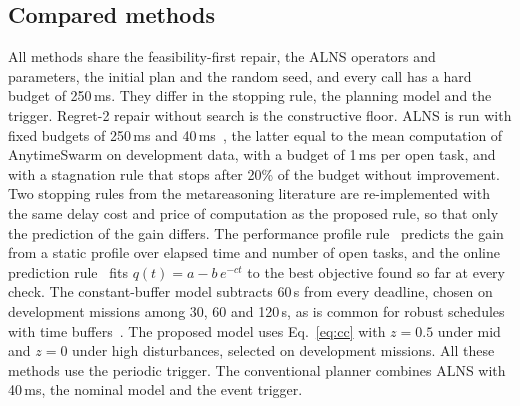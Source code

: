 \subsection{Compared methods}\label{sec:methods}
All methods share the feasibility-first repair, the ALNS operators and parameters, the initial plan and the random seed,
and every call has a hard budget of 250\,ms. They differ in the stopping rule, the planning model and the trigger.
Regret-2 repair without search is the constructive floor. ALNS is run with fixed budgets of 250\,ms and
40\,ms~\cite{ropke2006adaptive}, the latter equal to the mean computation of AnytimeSwarm on development data, with a
budget of 1\,ms per open task, and with a stagnation rule that stops after 20\% of the budget without improvement. Two
stopping rules from the metareasoning literature are re-implemented with the same delay cost and price of computation
as the proposed rule, so that only the prediction of the gain differs. The performance profile
rule~\cite{boddy1994deliberation,zilberstein1996using} predicts the gain from a static profile over elapsed time and
number of open tasks, and the online prediction rule~\cite{svegliato2018meta} fits $q(t)=a-b\,e^{-ct}$ to the best
objective found so far at every check. The constant-buffer model subtracts 60\,s from every deadline, chosen on
development missions among 30, 60 and 120\,s, as is common for robust schedules with time
buffers~\cite{agra2013robust}. The proposed model uses Eq.~\eqref{eq:cc} with $z=0.5$ under mid and $z=0$ under high
disturbances, selected on development missions. All these methods use the periodic trigger. The conventional planner
combines ALNS with 40\,ms, the nominal model and the event trigger.

